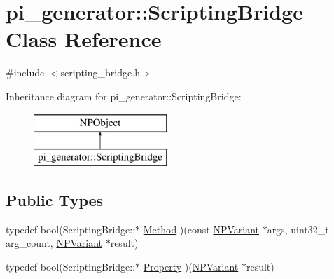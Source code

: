 \hypertarget{classpi__generator_1_1_scripting_bridge}{
\section{pi\_\-generator::ScriptingBridge Class Reference}
\label{classpi__generator_1_1_scripting_bridge}
}


{\ttfamily \#include $<$scripting\_\-bridge.h$>$}

Inheritance diagram for pi\_\-generator::ScriptingBridge:\begin{figure}[H]
\begin{center}
\leavevmode
\includegraphics[height=2cm]{classpi__generator_1_1_scripting_bridge}
\end{center}
\end{figure}
\subsection*{Public Types}
\begin{DoxyCompactItemize}
\item 
typedef bool(ScriptingBridge::$\ast$ \hyperlink{classpi__generator_1_1_scripting_bridge_a48f5f7b0dfb3daabcdbfb3f7b667fd39}{Method} )(const \hyperlink{struct___n_p_variant}{NPVariant} $\ast$args, uint32\_\-t arg\_\-count, \hyperlink{struct___n_p_variant}{NPVariant} $\ast$result)
\item 
typedef bool(ScriptingBridge::$\ast$ \hyperlink{classpi__generator_1_1_scripting_bridge_abcd8cffa7f26f348e68cde316038245f}{Property} )(\hyperlink{struct___n_p_variant}{NPVariant} $\ast$result)
\end{DoxyCompactItemize}
